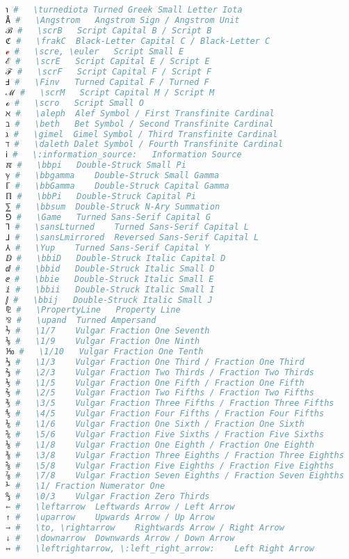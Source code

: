 \begin{lstlisting}[language=Julia, style=julia, linewidth=\textwidth]
℩ #   \turnediota Turned Greek Small Letter Iota
Å #   \Angstrom   Angstrom Sign / Angstrom Unit
ℬ #   \scrB   Script Capital B / Script B
ℭ #   \frakC  Black-Letter Capital C / Black-Letter C
ℯ #   \scre, \euler   Script Small E
ℰ #   \scrE   Script Capital E / Script E
ℱ #   \scrF   Script Capital F / Script F
Ⅎ #   \Finv   Turned Capital F / Turned F
ℳ #   \scrM   Script Capital M / Script M
ℴ #   \scro   Script Small O
ℵ #   \aleph  Alef Symbol / First Transfinite Cardinal
ℶ #   \beth   Bet Symbol / Second Transfinite Cardinal
ℷ #   \gimel  Gimel Symbol / Third Transfinite Cardinal
ℸ #   \daleth Dalet Symbol / Fourth Transfinite Cardinal
ℹ #   \:information_source:   Information Source
ℼ #   \bbpi   Double-Struck Small Pi
ℽ #   \bbgamma    Double-Struck Small Gamma
ℾ #   \bbGamma    Double-Struck Capital Gamma
ℿ #   \bbPi   Double-Struck Capital Pi
⅀ #   \bbsum  Double-Struck N-Ary Summation
⅁ #   \Game   Turned Sans-Serif Capital G
⅂ #   \sansLturned    Turned Sans-Serif Capital L
⅃ #   \sansLmirrored  Reversed Sans-Serif Capital L
⅄ #   \Yup    Turned Sans-Serif Capital Y
ⅅ #   \bbiD   Double-Struck Italic Capital D
ⅆ #   \bbid   Double-Struck Italic Small D
ⅇ #   \bbie   Double-Struck Italic Small E
ⅈ #   \bbii   Double-Struck Italic Small I
ⅉ #   \bbij   Double-Struck Italic Small J
⅊ #   \PropertyLine   Property Line
⅋ #   \upand  Turned Ampersand
⅐ #   \1/7    Vulgar Fraction One Seventh
⅑ #   \1/9    Vulgar Fraction One Ninth
⅒ #   \1/10   Vulgar Fraction One Tenth
⅓ #   \1/3    Vulgar Fraction One Third / Fraction One Third
⅔ #   \2/3    Vulgar Fraction Two Thirds / Fraction Two Thirds
⅕ #   \1/5    Vulgar Fraction One Fifth / Fraction One Fifth
⅖ #   \2/5    Vulgar Fraction Two Fifths / Fraction Two Fifths
⅗ #   \3/5    Vulgar Fraction Three Fifths / Fraction Three Fifths
⅘ #   \4/5    Vulgar Fraction Four Fifths / Fraction Four Fifths
⅙ #   \1/6    Vulgar Fraction One Sixth / Fraction One Sixth
⅚ #   \5/6    Vulgar Fraction Five Sixths / Fraction Five Sixths
⅛ #   \1/8    Vulgar Fraction One Eighth / Fraction One Eighth
⅜ #   \3/8    Vulgar Fraction Three Eighths / Fraction Three Eighths
⅝ #   \5/8    Vulgar Fraction Five Eighths / Fraction Five Eighths
⅞ #   \7/8    Vulgar Fraction Seven Eighths / Fraction Seven Eighths
⅟ #   \1/ Fraction Numerator One
↉ #   \0/3    Vulgar Fraction Zero Thirds
← #   \leftarrow  Leftwards Arrow / Left Arrow
↑ #   \uparrow    Upwards Arrow / Up Arrow
→ #   \to, \rightarrow    Rightwards Arrow / Right Arrow
↓ #   \downarrow  Downwards Arrow / Down Arrow
↔ #   \leftrightarrow, \:left_right_arrow:    Left Right Arrow

\end{lstlisting}
